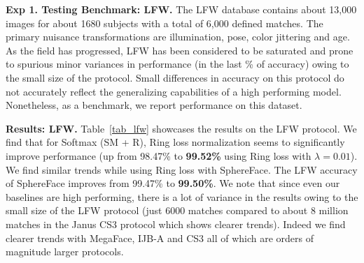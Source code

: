 \documentclass[10pt,twocolumn,letterpaper]{article}
\begin{document}
\textbf{Exp 1. Testing Benchmark: LFW.} The LFW \cite{LFWTech} database contains about 13,000 images for about 1680 subjects with a total of 6,000 defined matches. The primary nuisance transformations are illumination, pose, color jittering and age. As the field has progressed, LFW has been considered to be saturated and prone to spurious minor variances in performance (in the last \% of accuracy) owing to the small size of the protocol. Small differences in accuracy on this protocol do not accurately reflect the generalizing capabilities of a high performing model. Nonetheless, as a benchmark, we report performance on this dataset.


\textbf{Results: LFW.}  Table~\ref{tab_lfw} showcases the results on the LFW protocol. We find that for Softmax (SM + R), Ring loss normalization seems to significantly improve performance (up from 98.47\% to \textbf{99.52\%} using Ring loss with $\lambda=0.01$). We find similar trends while using Ring loss with SphereFace. The LFW accuracy of SphereFace improves from 99.47\% to \textbf{99.50\%}. We note that since even our baselines are high performing, there is a lot of variance in the results owing to the small size of the LFW protocol (just 6000 matches compared to about 8 million matches in the Janus CS3 protocol which shows clearer trends). Indeed we find clearer trends with MegaFace, IJB-A and CS3 all of which are orders of magnitude larger protocols.

\end{document}
